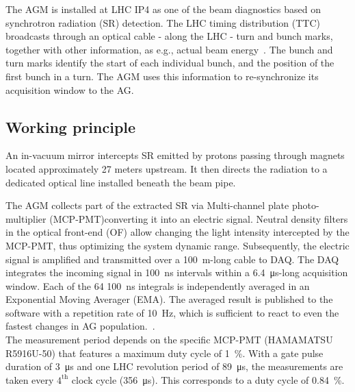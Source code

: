 %
The AGM is installed at LHC IP4 as one of the beam diagnostics based on synchrotron radiation (SR) detection. %
%
The LHC timing distribution (TTC) broadcasts through an optical cable - along the LHC - turn and bunch marks, together with other information, as e.g., actual beam energy~\cite{ttc_distribution}.
%
The bunch and turn marks identify the start of each individual bunch, and the position of the first bunch in a turn.   
%
The AGM uses this information to re-synchronize its acquisition window to the AG.
%
\subsection{Working principle}
%
An in-vacuum mirror intercepts  SR  emitted by protons passing through magnets located approximately 27 meters upstream. It then directs the radiation to a dedicated optical line installed beneath the beam pipe.

%
The AGM collects part of the extracted SR via Multi-channel plate photo-multiplier (MCP-PMT)converting it into an electric signal.
%
Neutral density filters in the optical front-end (OF) allow  changing the light intensity intercepted by the MCP-PMT, thus optimizing the system dynamic range.
% 
Subsequently, the electric signal is amplified and transmitted over a \SI{100}{m}-long cable to DAQ.
%
The DAQ integrates the incoming signal in \SI{100}{\nano\second} intervals within a \SI{6.4}{\micro\second}-long acquisition window.
%
Each of the 64 \SI{100}{\nano\second} integrals is independently averaged in an Exponential Moving Averager (EMA).
%
The averaged result is published to the software with a repetition rate of \SI{10}{Hz}, which is sufficient to react to even the fastest changes in AG population.~\cite{high_sensitivity_measurement}.
%
\\
The measurement period depends on the specific MCP-PMT (HAMAMATSU R5916U-50) that features a maximum duty cycle of \SI{1}{\%}. 
%
%
%
With a gate pulse duration of \SI{3}{\micro\second} and one LHC revolution period of \SI{89}{\micro\second}, the measurements are taken every $4^{\text{th}}$ clock cycle (\SI{356}{\micro\second}).
%
This corresponds to a duty cycle of \SI{0.84}{\%}.
\\
%

